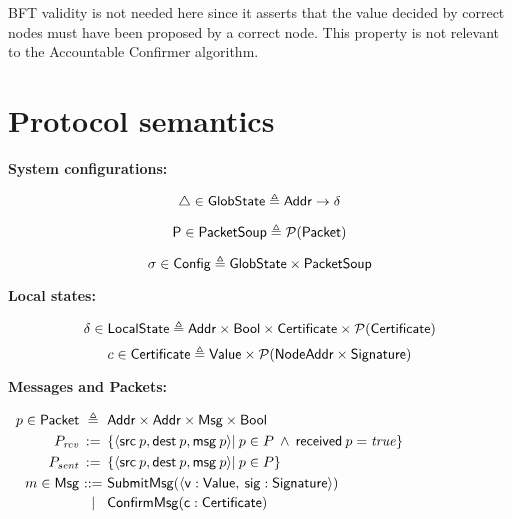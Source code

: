 \documentclass{article}
\begin{document}
\vspace{2mm}
\noindent BFT validity is not needed here since it asserts that the value decided by correct nodes must have been proposed by a correct node. This property is not relevant to the Accountable Confirmer algorithm.

\section{Protocol semantics}

\textbf{System configurations:}

\begin{equation*}
    \triangle \in \mathsf{GlobState} \triangleq \mathsf{Addr} \to \delta
\end{equation*}

\begin{equation*}
    \mathsf{P} \in \mathsf{PacketSoup} \triangleq \mathcal{P}(\mathsf{Packet})
\end{equation*}


\begin{equation*}
    \sigma \in \mathsf{Config} \triangleq \mathsf{GlobState} \times \mathsf{PacketSoup} 
\end{equation*}

\vspace{2mm}

\noindent \textbf{Local states:}
\vspace{2mm}

\begin{equation*}
    \delta \in \mathsf{LocalState} \triangleq \mathsf{Addr} \times \mathsf{Bool} \times \mathsf{Certificate} \times \mathcal{P}(\mathsf{Certificate}) 
\end{equation*}
\begin{equation*}
    c \in \mathsf{Certificate} \triangleq \mathsf{Value} \times \mathcal{P}(\mathsf{NodeAddr} \times \mathsf{Signature})
\end{equation*}

\vspace{2mm}

\noindent \textbf{Messages and Packets:}
\vspace{2mm}

$
\begin{array}{r@{\ }c@{\ }l}
  p \in \Packet & \eqdef & \Addr \times \Addr \times \Msg \times \Bool
  \\[3pt]
  P_{\mathit{rcv}} & := & \{ \angled{\src \: p, \dest \: p, \msg \: p} | \: p \in P \: \wedge \: \received \: p = \mathit{true} \} \\[3pt]
  P_{\mathit{sent}} & := & \{ \angled{\src \: p, \dest \: p, \msg \: p} | \: p \in P \} \\[3pt]
  m \in \Msg & ::= & \submitmsg (\angled{\mathsf{v} : \Value, \: \mathsf{sig} : \mathsf{Signature}}) \\[2pt]
               & | & \confirmmsg (\mathsf{c} : \Cert)
\end{array}
$
\end{document}
